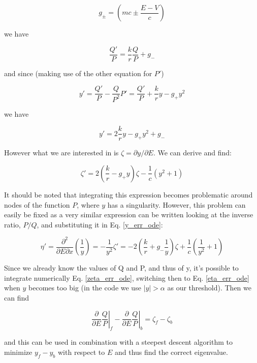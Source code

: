 \documentclass[]{report}
\begin{document}
\begin{equation}
g_\pm = \left(mc\pm\frac{E-V}{c}\right)
\end{equation}

we have

\begin{equation}
\frac{Q'}{P} = \frac{k}{r}\frac{Q}{P}+g_-
\end{equation}

and since (making use of the other equation for $P'$)

\begin{equation}
y' = \frac{Q'}{P} - \frac{Q}{P^2}P' = \frac{Q'}{P} + \frac{k}{r} y -g_+y^2
\end{equation}

we have

\begin{equation}\label{y_err_ode}
y' = 2\frac{k}{r}y-g_+y^2+g_-
\end{equation}

However what we are interested in is $\zeta = \partial y / \partial E$. We can derive and find:

\begin{equation}\label{zeta_err_ode}
\zeta' = 2\left(\frac{k}{r}-g_+y\right)\zeta-\frac{1}{c}(y^2+1)
\end{equation}

It should be noted that integrating this expression becomes problematic around nodes of the function $P$, where $y$ has a singularity. However, this problem can easily be fixed as a very similar expression can be written looking at the inverse ratio, $P/Q$, and substituting it in Eq. \ref{y_err_ode}:

\begin{equation}\label{eta_err_ode}
\eta' =\frac{\partial^2}{\partial E\partial x}\left(\frac{1}{y}\right) = -\frac{1}{y^2}\zeta' = -2\left(\frac{k}{r}+g_-\frac{1}{y}\right)\zeta+\frac{1}{c}(\frac{1}{y^2}+1)
\end{equation}

Since we already know the values of Q and P, and thus of y, it's possible to integrate numerically Eq. \ref{zeta_err_ode}, switching then to Eq. \ref{eta_err_ode} when $y$ becomes too big (in the code we use $|y|>\alpha$ as our threshold). Then we can find

\begin{equation}
\frac{\partial}{\partial E}\left. \frac{Q}{P}\right|_f - \frac{\partial}{\partial E}\left. \frac{Q}{P}\right|_b = \zeta_f-\zeta_b
\end{equation}

and this can be used in combination with a steepest descent algorithm to minimize $y_f-y_b$ with respect to $E$ and thus find the correct eigenvalue.




\end{document}
